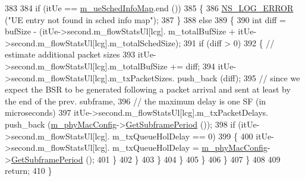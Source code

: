 \begin{DoxyCode}
383 
384                                         \textcolor{keywordflow}{if} (itUe == \hyperlink{classns3_1_1MmWaveFlexTtiMaxWeightMacScheduler_a6c90cb4d10b9d6347f7447508f5bebfe}{m\_ueSchedInfoMap}.end ())
385                                         \{
386                                                 \hyperlink{group__logging_ga0261a8db1d4ac5f79417d117634fd455}{NS\_LOG\_ERROR} (\textcolor{stringliteral}{"UE entry not found in sched info
       map"});
387                                         \}
388                                         \textcolor{keywordflow}{else}
389                                         \{
390                                                 \textcolor{keywordtype}{int} diff = bufSize - (itUe->second.m\_flowStatsUl[lcg].
      m\_totalBufSize + itUe->second.m\_flowStatsUl[lcg].m\_totalSchedSize);
391                                                 \textcolor{keywordflow}{if} (diff > 0)
392                                                 \{       \textcolor{comment}{// estimate additional packet sizes}
393                                                         itUe->second.m\_flowStatsUl[lcg].m\_totalBufSize += 
      diff;
394                                                         itUe->second.m\_flowStatsUl[lcg].m\_txPacketSizes.
      push\_back (diff);
395                                                         \textcolor{comment}{// since we expect the BSR to be generated
       following a packet arrival and sent at least by the end of the prev. subframe,}
396                                                         \textcolor{comment}{// the maximum delay is one SF (in microseconds)}
397                                                         itUe->second.m\_flowStatsUl[lcg].m\_txPacketDelays.
      push\_back (\hyperlink{classns3_1_1MmWaveMacScheduler_a24d7af4971d2e500fe543cefbafa2fd9}{m\_phyMacConfig}->\hyperlink{classns3_1_1MmWavePhyMacCommon_a1d402260d29c8931dd3dde73b295e23d}{GetSubframePeriod} ());
398                                                         \textcolor{keywordflow}{if} (itUe->second.m\_flowStatsUl[lcg].
      m\_txQueueHolDelay == 0)
399                                                         \{
400                                                                 itUe->second.m\_flowStatsUl[lcg].
      m\_txQueueHolDelay = \hyperlink{classns3_1_1MmWaveMacScheduler_a24d7af4971d2e500fe543cefbafa2fd9}{m\_phyMacConfig}->\hyperlink{classns3_1_1MmWavePhyMacCommon_a1d402260d29c8931dd3dde73b295e23d}{GetSubframePeriod} ();
401                                                         \}
402                                                 \}
403                                         \}
404                                 \}
405                         \}
406                 \}
407         \}
408 
409         \textcolor{keywordflow}{return};
410 \}
\end{DoxyCode}


